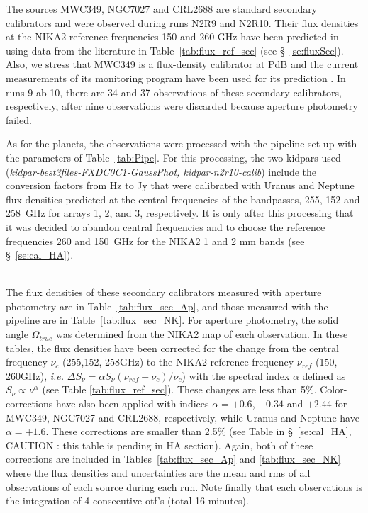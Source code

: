 The sources  MWC349, NGC7027 and CRL2688 are standard secondary calibrators
and were observed during runs N2R9 and N2R10. Their flux densities at the NIKA2 reference frequencies 150 and 260 GHz
have been predicted  in using data from the literature
in Table~\ref{tab:flux_ref_sec} (see \S~\ref{se:fluxSec}).  Also, we stress that MWC349 is a flux-density calibrator at PdB and
the current measurements of its monitoring program have been used for its prediction \cite{krips}.
In runs 9 ab 10, there are 34 and 37 observations of these secondary calibrators, respectively, after nine observations were discarded because
aperture photometry failed.

As for the planets, the observations were processed with the pipeline set up with the parameters
of Table~\ref{tab:Pipe}. For this processing,
the two kidpars used ({\it kidpar-best3files-FXDC0C1-GaussPhot, kidpar-n2r10-calib})  include the conversion factors
from Hz to Jy that were calibrated with Uranus and Neptune flux densities predicted at the central frequencies
of the bandpasses, 255, 152 and 258~GHz for arrays 1, 2,
and 3,  respectively. It is only after this processing that it was decided to abandon central frequencies
and to choose the reference frequencies 260 and 150~GHz for the NIKA2 1 and 2 mm  bands (see \S~\ref{se:cal_HA}).


\\


The flux densities of these secondary calibrators measured with  aperture photometry are in Table~\ref{tab:flux_sec_Ap},
and those measured with  the pipeline are in Table~\ref{tab:flux_sec_NK}. For aperture photometry, the solid angle $\Omega_{true}$
was determined from the NIKA2 map of each observation.
In these tables, the flux densities have been corrected for the change from
the central frequency $\nu_c$ (255,152, 258GHz) to the NIKA2 reference frequency $\nu_{ref}$ (150, 260GHz), {\it i.e.}
$\Delta S_{\nu}  = \alpha S_{\nu} (\nu_{ref}-\nu_c)/\nu_c $) with the spectral index $\alpha$ defined
as $S_{\nu} \propto \nu^{\alpha}$ (see Table \ref{tab:flux_ref_sec}). These changes are less than 5\%.
Color-corrections have also been applied
with indices $\alpha=+0.6$, $-0.34$ and $+2.44$ for MWC349, NGC7027 and CRL2688, respectively, while Uranus and
Neptune have $\alpha=+1.6$. These corrections are smaller than 2.5\% (see Table in
\S~\ref{se:cal_HA}, CAUTION : this table is pending in  HA section).  Again, both of these corrections are included
in Tables~\ref{tab:flux_sec_Ap} and \ref{tab:flux_sec_NK} where the flux densities and uncertainties are the mean and rms
of all observations of each source during each run. Note finally that each observations is the integration of 4 consecutive otf's (total 16 minutes). 


